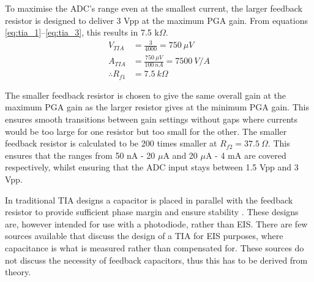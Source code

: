 To maximise the \ac{ADC}'s range even at the smallest current, the larger feedback resistor is designed to deliver 3 Vpp at the maximum \ac{PGA} gain. From equations \ref{eq:tia_1}--\ref{eq:tia_3}, this results in 7.5 k$\Omega$.
\begin{align}
        V_{TIA} &= \frac{3}{4000} = 750\ \mu V \label{eq:tia_1}\\
        A_{TIA} &= \frac{750\ \mu V}{100\ nA} = 7500\ V/A \\
        \therefore  R_{f1} &= 7.5\ k\Omega \label{eq:tia_3}
\end{align}

The smaller feedback resistor is chosen to give the same overall gain at the maximum \ac{PGA} gain as the larger resistor gives at the minimum \ac{PGA} gain. This ensures smooth transitions between gain settings without gaps where currents would be too large for one resistor but too small for the other. The smaller feedback resistor is calculated to be 200 times smaller at $R_{f2}=37.5~\Omega$. This ensures that the ranges from 50 nA - 20 $\mu$A and 20 $\mu$A - 4 mA are covered respectively, whilst ensuring that the \ac{ADC} input stays between 1.5 Vpp and 3 Vpp.

In traditional TIA designs a capacitor is placed in parallel with the feedback resistor to provide sufficient phase margin and ensure stability \cite{StabilizeYourTransimpedance}. These designs are, however intended for use with a photodiode, rather than \ac{EIS}. There are few sources available that discuss the design of a TIA for EIS purposes, where capacitance is what is measured rather than compensated for. These sources do not discuss the necessity of feedback capacitors, thus this has to be derived from theory.

